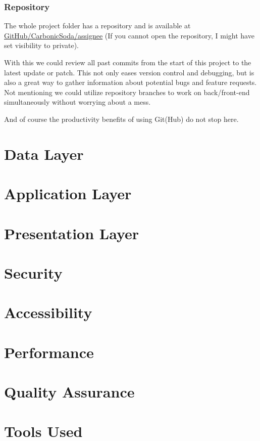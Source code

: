 \documentclass[12pt]{report}
\begin{document}
\subsection{Repository} \label{overview.project-structure.repository}

The whole project folder has a repository and is available at
\href{https://github.com/CarbonicSoda/assignee}{GitHub/Carbonic\-Soda/assignee}
(If you cannot open the repository, I might have set visibility to private).
\vspace{1 em}

With this we could review all past commits from the start of this project to the latest update or patch.
This not only eases version control and debugging,
but is also a great way to gather information about potential bugs and feature requests.
Not mentioning we could utilize repository branches to work on back/front-end simultaneously without worrying about a mess.
\vspace{1 em}

And of course the productivity benefits of using Git(Hub) do not stop here.

\chapter{Data Layer} \label{data-layer}


\chapter{Application Layer} \label{application-layer}


\chapter{Presentation Layer} \label{presentation-layer}


\chapter{Security} \label{security}


\chapter{Accessibility} \label{accessibility}


\chapter{Performance} \label{performance}


\chapter{Quality Assurance} \label{quality-assurance}


\chapter{Tools Used} \label{tools-used}
\end{document}
